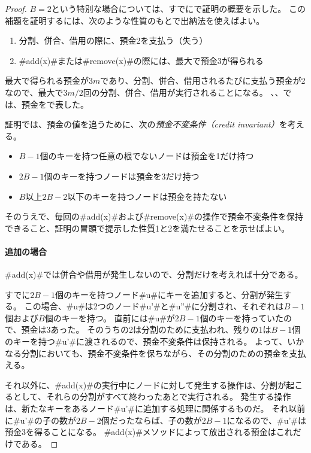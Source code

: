 \begin{proof}
   $B=2$という特別な場合については、すでにで証明の概要を示した。
   この補題を証明するには、次のような性質のもとで出納法を使えばよい。
  \begin{enumerate}
    \item 分割、併合、借用の際に、預金2を支払う（失う）
    \item #add(x)#または#remove(x)#の際には、最大で預金3が得られる
  \end{enumerate}
  最大で得られる預金が$3m$であり、分割、併合、借用されるたびに支払う預金が2なので、最大で$3m/2$回の分割、併合、借用が実行されることになる。
  、、では、預金を\cent{}で表した。

  証明では、預金の値を追うために、次の\emph{預金不変条件（credit invariant）}を考える。%
  \begin{itemize}
  \item $B-1$個のキーを持つ任意の根でないノードは預金を1だけ持つ
  \item $2B-1$個のキーを持つノードは預金を3だけ持つ
  \item $B$以上$2B-2$以下のキーを持つノードは預金を持たない
  \end{itemize}
  そのうえで、毎回の#add(x)#および#remove(x)#の操作で預金不変条件を保持できること、証明の冒頭で提示した性質1と2を満たせることを示せばよい。

  \paragraph{追加の場合}
  #add(x)#では併合や借用が発生しないので、分割だけを考えれば十分である。

  すでに$2B-1$個のキーを持つノード#u#にキーを追加すると、分割が発生する。
  この場合、#u#は2つのノード#u'#と#u''#に分割され、それぞれは$B-1$個および$B$個のキーを持つ。
  直前には#u#が$2B-1$個のキーを持っていたので、預金は3あった。
  そのうちの2は分割のために支払われ、残りの1は$B-1$個のキーを持つ#u'#に渡されるので、預金不変条件は保持される。
  よって、いかなる分割においても、預金不変条件を保ちながら、その分割のための預金を支払える。

  それ以外に、#add(x)#の実行中にノードに対して発生する操作は、分割が起こるとして、それらの分割がすべて終わったあとで実行される。
  発生する操作は、新たなキーをあるノード#u'#に追加する処理に関係するものだ。
  それ以前に#u'#の子の数が$2B-2$個だったならば、子の数が$2B-1$になるので、#u'#は預金3を得ることになる。
  #add(x)#メソッドによって放出される預金はこれだけである。


\end{proof}

